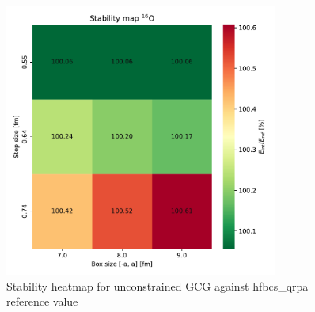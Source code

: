 \begin{figure}
  \centering
\includegraphics[width = 0.8\textwidth, keepaspectratio]{figures/stability.pdf}
\caption{Stability heatmap for unconstrained GCG against hfbcs\_qrpa reference value}
\end{figure}

